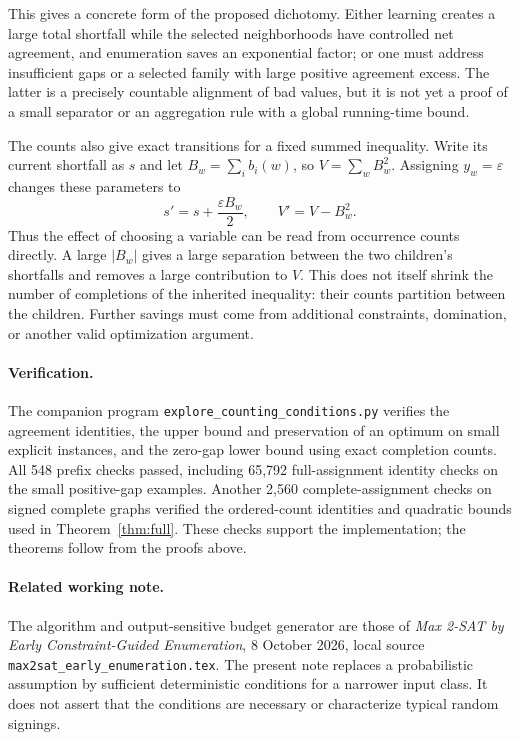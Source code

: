 \documentclass[11pt,a4paper]{article}
\begin{document}
This gives a concrete form of the proposed dichotomy. Either learning
creates a large total shortfall while the selected neighborhoods have
controlled net agreement, and enumeration saves an exponential factor;
or one must address insufficient gaps or a selected family with large
positive agreement excess. The latter is a precisely countable alignment
of bad values, but it is not yet a proof of a small separator or an
aggregation rule with a global running-time bound.

The counts also give exact transitions for a fixed summed inequality.
Write its current shortfall as $s$ and let
$B_w=\sum_i b_i(w)$, so $V=\sum_wB_w^2$. Assigning $y_w=\varepsilon$
changes these parameters to
\[
 s'=s+\frac{\varepsilon B_w}{2},\qquad V'=V-B_w^2.
\]
Thus the effect of choosing a variable can be read from occurrence
counts directly. A large $|B_w|$ gives a large separation between the
two children's shortfalls and removes a large contribution to $V$.
This does not itself shrink the number of completions of the inherited
inequality: their counts partition between the children. Further savings
must come from additional constraints, domination, or another valid
optimization argument.

\paragraph{Verification.}
The companion program \texttt{explore\_counting\_conditions.py} verifies
the agreement identities, the upper bound and preservation of an optimum
on small explicit instances, and the zero-gap lower bound using exact
completion counts. All 548 prefix checks passed, including 65,792
full-assignment identity checks on the small positive-gap examples.
Another 2,560 complete-assignment checks on signed complete graphs
verified the ordered-count identities and quadratic bounds used in
Theorem~\ref{thm:full}. These checks support the implementation; the
theorems follow from the proofs above.

\paragraph{Related working note.}
The algorithm and output-sensitive budget generator are those of
\emph{Max 2-SAT by Early Constraint-Guided Enumeration}, 8 October 2026,
local source \texttt{max2sat\_early\_enumeration.tex}. The present note
replaces a probabilistic assumption by sufficient deterministic
conditions for a narrower input class. It does not assert that the
conditions are necessary or characterize typical random signings.
\end{document}
